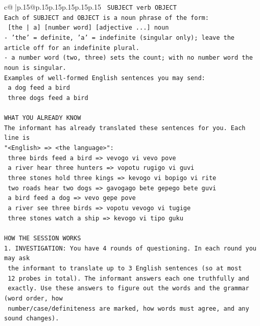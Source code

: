 \documentclass{article}
\begin{document}
{\begin{supertabular}{c@{$\;$}|p{.15\linewidth}@{}p{.15\linewidth}p{.15\linewidth}p{.15\linewidth}p{.15\linewidth}p{.15\linewidth}}
{{{\texttt{    SUBJECT  verb  OBJECT} \\
\texttt{Each of SUBJECT and OBJECT is a noun phrase of the form:} \\
\texttt{    {[}the | a{]}  {[}number word{]}  {[}adjective ...{]}  noun} \\
\texttt{{-} 'the' = definite, 'a' = indefinite (singular only); leave the article off for an indefinite plural.} \\
\texttt{{-} a number word (two, three) sets the count; with no number word the noun is singular.} \\
\texttt{Examples of well{-}formed English sentences you may send:} \\
\texttt{    a dog feed a bird} \\
\texttt{    three dogs feed a bird} \\
\\ 
\texttt{WHAT YOU ALREADY KNOW} \\
\texttt{The informant has already translated these sentences for you. Each line is} \\
\texttt{"<English>  =>  <the language>":} \\
\texttt{    three birds feed a bird  =>  vevogo vi vevo pove} \\
\texttt{    a river hear three hunters  =>  vopotu rugigo vi guvi} \\
\texttt{    three stones hold three kings  =>  kevogo vi bopigo vi rite} \\
\texttt{    two roads hear two dogs  =>  gavogago bete gepego bete guvi} \\
\texttt{    a bird feed a dog  =>  vevo gepe pove} \\
\texttt{    a river see three birds  =>  vopotu vevogo vi tugige} \\
\texttt{    three stones watch a ship  =>  kevogo vi tipo guku} \\
\\ 
\texttt{HOW THE SESSION WORKS} \\
\texttt{1. INVESTIGATION: You have 4 rounds of questioning. In each round you may ask} \\
\texttt{   the informant to translate up to 3 English sentences (so at most} \\
\texttt{   12 probes in total). The informant answers each one truthfully and} \\
\texttt{   exactly. Use these answers to figure out the words and the grammar (word order, how} \\
\texttt{   number/case/definiteness are marked, how words must agree, and any sound changes).} \\
}}}
\end{supertabular}}
\end{document}
